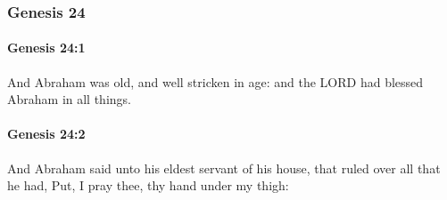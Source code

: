 	\subsubsection{Genesis 24} %
		\label{GENESIS-24}

		\paragraph{Genesis 24:1} %
			\label{GENESIS-24-1}

			And Abraham was old, and well stricken in age: and the LORD had blessed Abraham in all things.


		\paragraph{Genesis 24:2} %
			\label{GENESIS-24-2}

			And Abraham said unto his eldest servant of his house, that ruled over all that he had, Put, I pray thee, thy hand under my thigh:

